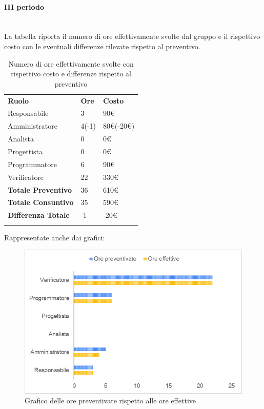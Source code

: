 \paragraph{III periodo}  \mbox{} \\
La tabella riporta il numero di ore effettivamente svolte dal gruppo e il rispettivo costo con le eventuali differenze rilevate rispetto al preventivo.
\begin{longtable} {							
		>{}p{40mm}  
		>{}p{20mm}	
		>{}p{28mm}			
	}			
	\rowcolor{gray!50}
	
	\textbf{Ruolo}            & \textbf{Ore} & \textbf{Costo}       \TBstrut \\
	Responsabile              & 3            & 90\euro              \TBstrut \\
	Amministratore            & 4(-1)        & 80\euro (-20\euro)   \TBstrut \\
	Analista                  & 0            & 0\euro               \TBstrut \\
	Progettista               & 0            & 0\euro               \TBstrut \\
	Programmatore             & 6            & 90\euro              \TBstrut \\
	Verificatore              & 22           & 330\euro             \TBstrut \\
	\textbf{Totale Preventivo}& 36           & 610\euro             \TBstrut \\	
	\textbf{Totale Consuntivo}& 35           & 590\euro             \TBstrut \\	
	\textbf{Differenza Totale}& -1           & -20\euro             \TBstrut \\
	\rowcolor{white}
	\caption{Numero di ore effettivamente svolte con rispettivo costo e differenze rispetto al preventivo}	
\end{longtable}

Rappresentate anche dai grafici:
\begin{figure} [H]
	\includegraphics[width=\linewidth]{./img/Grafici/ra-consuntivo7.png}
	\caption{Grafico delle ore preventivate rispetto alle ore effettive}
\end{figure}

